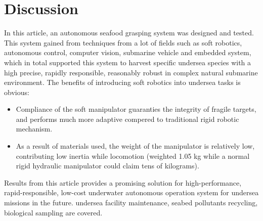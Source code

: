 \section{Discussion}

In this article, an autonomous seafood grasping system was designed and tested.
This system gained from techniques from a lot of fields such as soft robotics,
autonomous control, computer vision, submarine vehicle and embedded system,
which in total supported this system to harvest specific undersea species with a
high precise, rapidly responsible, reasonably robust in complex natural
submarine environment. The benefits of introducing soft robotics into undersea
tasks is obvious:

\begin{itemize}
    \item Compliance of the soft manipulator guaranties the integrity of fragile
    targets, and performs much more adaptive compered to traditional rigid
    robotic mechanism.
    \item As a result of materials used, the weight of the manipulator is
    relatively low, contributing low inertia while locomotion (weighted 1.05 kg
    while a normal rigid hydraulic manipulator could claim tens of kilograms).
\end{itemize}

Results from this article provides a promising solution for high-performance,
rapid-responsible, low-cost underwater autonomous operation system for undersea
missions in the future. undersea facility maintenance, seabed pollutants
recycling, biological sampling are covered.